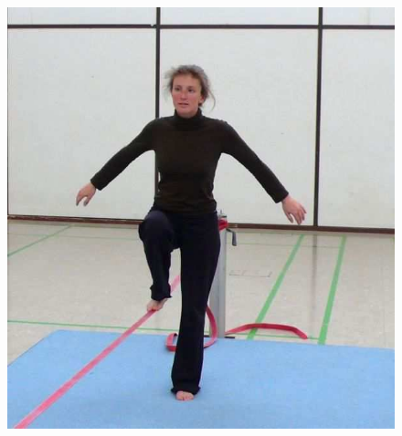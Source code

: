 \begin{figure}[htb]
	\centering
	\begin{minipage}[t]{0.30\linewidth}
		\centering
		\includegraphics[width=1\linewidth]{Pictures/slacklineBasicStart}
		\label{fig:slacklineBasicStart}
	\end{minipage}
	\hfill
	\begin{minipage}[t]{0.20\linewidth}
		\centering

\end{minipage}
\end{figure}
